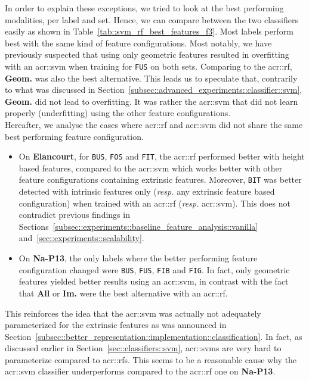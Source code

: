         In order to explain these exceptions, we tried to look at the best performing modalities, per label and set.
        Hence, we can compare between the two classifiers easily as shown in Table~\ref{tab::svm_rf_best_features_f3}.
        Most labels perform best with the same kind of feature configurations.
        Most notably, we have previously suspected that using only geometric features resulted in overfitting with an \gls{acr::svm} when training for \texttt{FUS} on both sets.
        Comparing to the \gls{acr::rf}, \textbf{Geom.} was also the best alternative.
        This leads us to speculate that, contrarily to what was discussed in Section~\ref{subsec::advanced_experiments::classifier::svm}, \textbf{Geom.} did not lead to overfitting.
        It was rather the \gls{acr::svm} that did not learn properly (underfitting) using the other feature configurations.\\

        Hereafter, we analyse the cases where \gls{acr::rf} and \gls{acr::svm} did not share the same best performing feature configuration.
        \begin{itemize}[label=\(\blacktriangleright\)]
            \item On \textbf{Elancourt}, for \texttt{BUS}, \texttt{FOS} and \texttt{FIT}, the \gls{acr::rf} performed better with height based features, compared to the \gls{acr::svm} which works better with other feature configurations containing extrinsic features.
                    Moreover, \texttt{BIT} was better detected with intrinsic features only (\textit{resp.} any extrinsic feature based configuration) when trained with an \gls{acr::rf} (\textit{resp.} \gls{acr::svm}).
                    This does not contradict previous findings in Sections~\ref{subsec::experiments::baseline_feature_analysis::vanilla} and~\ref{sec::experiments::scalability}.
            \item On \textbf{Na-P13}, the only labels where the better performing feature configuration changed were \texttt{BUS}, \texttt{FUS}, \texttt{FIB} and \texttt{FIG}.
                    In fact, only geometric features yielded better results using an \gls{acr::svm}, in contrast with the fact that \textbf{All} or \textbf{Im.} were the best alternative with an \gls{acr::rf}.
        \end{itemize}
        This reinforces the idea that the \gls{acr::svm} was actually not adequately parameterized for the extrinsic features as was announced in Section~\ref{subsec::better_representation::implementation::classification}.
        In fact, as discussed earlier in Section~\ref{sec::classifiers::svm}, \glspl{acr::svm} are very hard to parameterize compared to \glspl{acr::rf}.
        This seems to be a reasonable cause why the \gls{acr::svm} classifier underperforms compared to the \gls{acr::rf} one on \textbf{Na-P13}.

